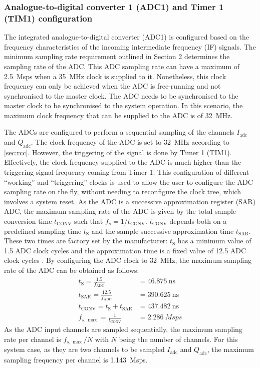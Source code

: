 \subsubsection{Analogue-to-digital converter 1 (ADC1) and Timer 1 (TIM1) configuration} \label{sec:adc_tim_config_v_vector}

The integrated analogue-to-digital converter (ADC1) is configured based on the frequency characteristics of the incoming intermediate frequency (IF) signals. The minimum sampling rate requirement outlined in Section 2 determines the sampling rate of the ADC. This ADC sampling rate can have a maximum of \SI{2.5}{Msps} when a \SI{35}{\mega\hertz} clock is supplied to it. Nonetheless, this clock frequency can only be achieved when the ADC is free-running and not synchronised to the master clock. The ADC needs to be synchronised to the master clock to be synchronised to the system operation. In this scenario, the maximum clock frequency that can be supplied to the ADC is of \SI{32}{\mega\hertz}.

The ADCs are configured to perform a sequential sampling of the channels $I_{\mathrm{adc}}$ and $Q_{\mathrm{adc}}$. The clock frequency of the ADC is set to  \SI{32}{\mega\hertz} according to \cref{sec:rcc}. However, the triggering of the signal is done by Timer 1 (TIM1). Effectively, the clock frequency supplied to the ADC is much higher than the triggering signal frequency coming from Timer 1. This configuration of different ``working'' and ``triggering'' clocks is used to allow the user to configure the ADC sampling rate on the fly, without needing to reconfigure the clock tree, which involves a system reset. As the ADC is a successive approximation register (SAR) ADC, the maximum sampling rate of the ADC is given by the total sample conversion time $t_\mathrm{CONV}$ such that $f_s = 1/t_\mathrm{CONV}$. $t_\mathrm{CONV}$ depends both on a predefined sampling time $t_\mathrm{S}$ and the sample successive approximation time $t_\mathrm{SAR}$. These two times are factory set by the manufacturer: $t_\mathrm{S}$ has a minimum value of 1.5 ADC clock cycles and the approximation time is a fixed value of 12.5 ADC clock cycles \cite[p.~104]{STMicroelectronics2022}.
By configuring the ADC clock to \SI{32}{\mega\hertz}, the maximum sampling rate of the ADC can be obtained as follows:
\begin{align}
	t_\mathrm{S} = \frac{1.5}{f_\mathrm{ADC}} &= \SI{46.875}{\nano\second}\\
	t_\mathrm{SAR} = \frac{12.5}{f_\mathrm{ADC}}
	&= \SI{390.625}{\nano\second}\\
	t_\mathrm{CONV} = t_\mathrm{S} + t_\mathrm{SAR} &= \SI{437.482}{\nano\second}\\
	f_{s,\max} = \frac{1}{t_\mathrm{CONV}} &= \SI{2.286}{Msps}
\end{align}
As the ADC input channels are sampled sequentially, the maximum sampling rate per channel is $f_{s,\max}/N$ with $N$ being the number of channels. For this system case, as they are two channels to be sampled $I_{\mathrm{adc}}$ and $Q_{\mathrm{adc}}$, the maximum sampling frequency per channel is \SI{1.143}{Msps}.

